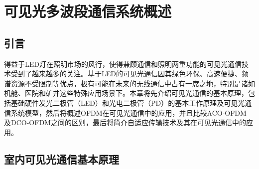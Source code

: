 \chapter{可见光多波段通信系统概述}
\section{引言}
得益于LED灯在照明市场的风行，使得兼顾通信和照明两重功能的可见光通信技术受到了越来越多的关注。基于LED的可见光通信因其绿色环保、高速便捷、频谱资源不受限制等优点，极有可能在未来的无线通信中占有一席之地，特别是诸如机舱、医院和矿井这些特殊应用场景下。本章将先介绍可见光通信的基本原理，包括基础硬件发光二极管（LED）和光电二极管（PD）的基本工作原理及可见光通信系统模型，然后将概述OFDM在可见光通信中的应用，并且比较ACO-OFDM 及DCO-OFDM之间的区别，最后将简介自适应传输技术及其在可见光通信中的应用。
\section{室内可见光通信基本原理}
